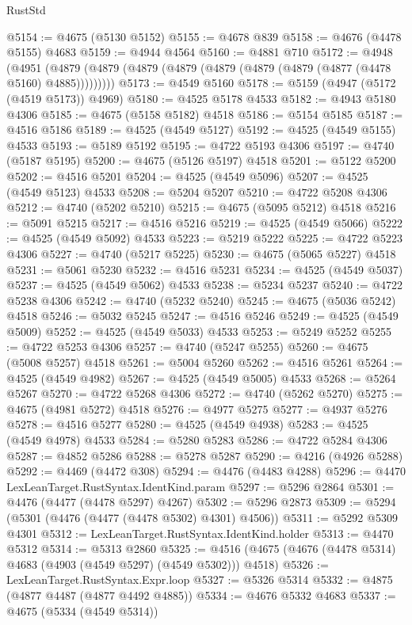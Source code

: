 \begin{lexlean}{RustStd}
\begin{coremodule}
{\begin{coremodule}
{{{{{{{{{{{{{{{{{{{{{{{{{{{{{{{{{{{{{{{{{{{{{{{{{{{{{{{{{{{{@5154 := @4675 (@5130 @5152)
@5155 := @4678 @839
@5158 := @4676 (@4478 @5155) @4683
@5159 := @4944 @4564
@5160 := @4881 @710
@5172 := @4948
    (@4951 (@4879 (@4879 (@4879 (@4879 (@4879 (@4879 (@4879 (@4877 (@4478 @5160) @4885)))))))))
@5173 := @4549 @5160
@5178 := @5159 (@4947 (@5172 (@4519 @5173)) @4969)
@5180 := @4525 @5178 @4533
@5182 := @4943 @5180 @4306
@5185 := @4675 (@5158 @5182) @4518
@5186 := @5154 @5185
@5187 := @4516 @5186
@5189 := @4525 (@4549 @5127)
@5192 := @4525 (@4549 @5155) @4533
@5193 := @5189 @5192
@5195 := @4722 @5193 @4306
@5197 := @4740 (@5187 @5195)
@5200 := @4675 (@5126 @5197) @4518
@5201 := @5122 @5200
@5202 := @4516 @5201
@5204 := @4525 (@4549 @5096)
@5207 := @4525 (@4549 @5123) @4533
@5208 := @5204 @5207
@5210 := @4722 @5208 @4306
@5212 := @4740 (@5202 @5210)
@5215 := @4675 (@5095 @5212) @4518
@5216 := @5091 @5215
@5217 := @4516 @5216
@5219 := @4525 (@4549 @5066)
@5222 := @4525 (@4549 @5092) @4533
@5223 := @5219 @5222
@5225 := @4722 @5223 @4306
@5227 := @4740 (@5217 @5225)
@5230 := @4675 (@5065 @5227) @4518
@5231 := @5061 @5230
@5232 := @4516 @5231
@5234 := @4525 (@4549 @5037)
@5237 := @4525 (@4549 @5062) @4533
@5238 := @5234 @5237
@5240 := @4722 @5238 @4306
@5242 := @4740 (@5232 @5240)
@5245 := @4675 (@5036 @5242) @4518
@5246 := @5032 @5245
@5247 := @4516 @5246
@5249 := @4525 (@4549 @5009)
@5252 := @4525 (@4549 @5033) @4533
@5253 := @5249 @5252
@5255 := @4722 @5253 @4306
@5257 := @4740 (@5247 @5255)
@5260 := @4675 (@5008 @5257) @4518
@5261 := @5004 @5260
@5262 := @4516 @5261
@5264 := @4525 (@4549 @4982)
@5267 := @4525 (@4549 @5005) @4533
@5268 := @5264 @5267
@5270 := @4722 @5268 @4306
@5272 := @4740 (@5262 @5270)
@5275 := @4675 (@4981 @5272) @4518
@5276 := @4977 @5275
@5277 := @4937 @5276
@5278 := @4516 @5277
@5280 := @4525 (@4549 @4938)
@5283 := @4525 (@4549 @4978) @4533
@5284 := @5280 @5283
@5286 := @4722 @5284 @4306
@5287 := @4852 @5286
@5288 := @5278 @5287
@5290 := @4216 (@4926 @5288)
@5292 := @4469 (@4472 @308)
@5294 := @4476 (@4483 @4288)
@5296 := @4470 LexLeanTarget.RustSyntax.IdentKind.param
@5297 := @5296 @2864
@5301 := @4476 (@4477 (@4478 @5297) @4267)
@5302 := @5296 @2873
@5309 := @5294 (@5301 (@4476 (@4477 (@4478 @5302) @4301) @4506))
@5311 := @5292 @5309 @4301
@5312 := LexLeanTarget.RustSyntax.IdentKind.holder
@5313 := @4470 @5312
@5314 := @5313 @2860
@5325 := @4516 (@4675 (@4676 (@4478 @5314) @4683 (@4903 (@4549 @5297) (@4549 @5302))) @4518)
@5326 := LexLeanTarget.RustSyntax.Expr.loop
@5327 := @5326 @5314
@5332 := @4875 (@4877 @4487 (@4877 @4492 @4885))
@5334 := @4676 @5332 @4683
@5337 := @4675 (@5334 (@4549 @5314))
}}}}}}}}}}}}}}}}}}}}}}}}}}}}}}}}}}}}}}}}}}}}}}}}}}}}}}}}}}}}
\end{coremodule}}
\end{coremodule}
\end{lexlean}
